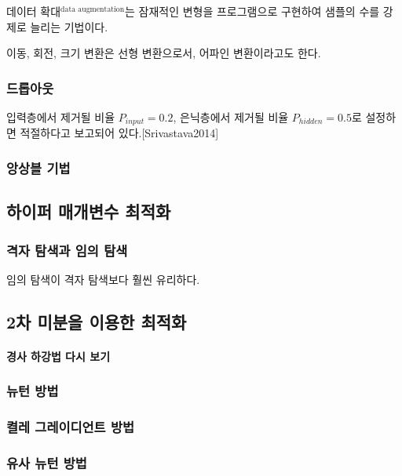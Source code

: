 \documentclass [12pt] {oblivoir}
\let\oldsubsubsection=\subsubsection
\renewcommand{\subsubsection}
{
  \filbreak
  \oldsubsubsection
}
\begin{document}
데이터 확대$^{\text{data augmentation}}$는 잠재적인 변형을 프로그램으로 구현하여 샘플의 수를 강제로 늘리는 기법이다.

이동, 회전, 크기 변환은 선형 변환으로서, 어파인 변환이라고도 한다.

\subsubsection{드롭아웃}

입력층에서 제거될 비율 $P_{input} = 0.2$, 은닉층에서 제거될 비율 $P_{hidden} = 0.5$로 설정하면 적절하다고 보고되어 있다.[Srivastava2014]

\subsubsection{앙상블 기법}

\subsection{하이퍼 매개변수 최적화}

\subsubsection{격자 탐색과 임의 탐색}

임의 탐색이 격자 탐색보다 훨씬 유리하다.

\subsection{2차 미분을 이용한 최적화}

\paragraph*{경사 하강법 다시 보기}\mbox{}

\vspace{3mm}

\subsubsection{뉴턴 방법}

\subsubsection{켤레 그레이디언트 방법}

\subsubsection{유사 뉴턴 방법}
\end{document}
